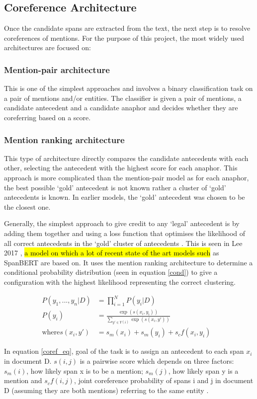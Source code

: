 
\subsection{Coreference Architecture}
Once the candidate spans are extracted from the text, the next step is to resolve coreferences of mentions. For the purpose of this project, the most widely used architectures are focused on: 

\subsubsection{Mention-pair architecture} 
This is one of the simplest approaches and involves a binary classification task on a pair of mentions and/or entities. The classifier is given a pair of mentions, a candidate antecedent and a candidate anaphor and decides whether they are coreferring based on a score. 

\subsubsection{Mention ranking architecture}

This type of architecture directly compares the candidate antecedents with each other,  selecting the antecedent with the highest score for each anaphor. This approach is more complicated than the mention-pair model as for each anaphor, the best possible ‘gold’ antecedent is not known rather a cluster of ‘gold’ antecedents is known. In earlier models, the ‘gold’ antecedent was chosen to be the closest one. 

Generally, the simplest approach to give credit to any ‘legal’ antecedent is by adding them together and using a loss function that optimises the likelihood of all correct antecedents in the ‘gold’ cluster of antecedents \cite{stanfordcoref}. This is seen in Lee 2017 \cite{lee2017end}, \hl{a model on which a lot of recent state of the art models such} as SpanBERT \cite{spanBERT} are based on. It uses the mention ranking architecture to determine a conditional probability distribution (seen in equation \ref{cond}) to give a configuration with the highest likelihood representing the correct clustering. 

\begin{align}
 P(y_1, ..., y_n | D)  &= \prod_{i=1}^{N} P(y_i | D) \label{cond} &\\
 P(y_i) &= \frac{\exp(s(x_i, y_i))}{\sum_{y' \in Y(i)} \exp(s(x_i,y'))}  \label{coref_eq} &\\
\text{where} s(x_i,y')  &= s_m (x_i) +  s_m (y_i)  +  s_cf(x_i, y_i) \nonumber
\end{align}

In equation \ref{coref_eq}, goal of the task is to assign an antecedent to each span $x_i$ in document D. \( s(i,j)\) is a pairwise score which depends on three factors:  \(s_m(i)\), how likely span x is to be a mention; \(s_m(j)\), how likely span y is a mention and \(s_cf(i, j)\), joint coreference probability of spans i and j  in document D (assuming they are both mentions) referring to the same entity \cite{lee2017end}\cite{lee2018coursetofine}.
